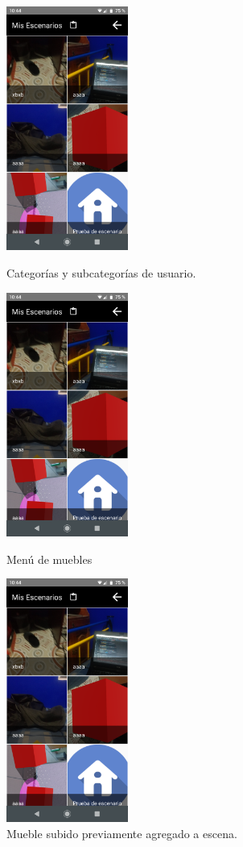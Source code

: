 \begin{figure}[h!]
	\begin{minipage}{0.32\textwidth}
		\centering
		\includegraphics[width=4cm,height=8cm]{imagenes/desarrollo/app/scenarios.png}
		\caption{Categorías y subcategorías de usuario.}
		\label{fig:appmenucat}
	\end{minipage}\hfill
	\begin{minipage}{0.32\textwidth}
		\centering
		\includegraphics[width=4cm,height=8cm]{imagenes/desarrollo/app/scenarios.png}
		\caption{Menú de muebles}
		\label{fig:appmenu}
	\end{minipage}\hfill
	\begin{minipage}{0.32\textwidth}
		\centering
		\includegraphics[width=4cm,height=8cm]{imagenes/desarrollo/app/scenarios.png}
		\caption{Mueble subido previamente agregado a escena.}
		\label{fig:appfurn}
	\end{minipage}\hfill
\end{figure}

